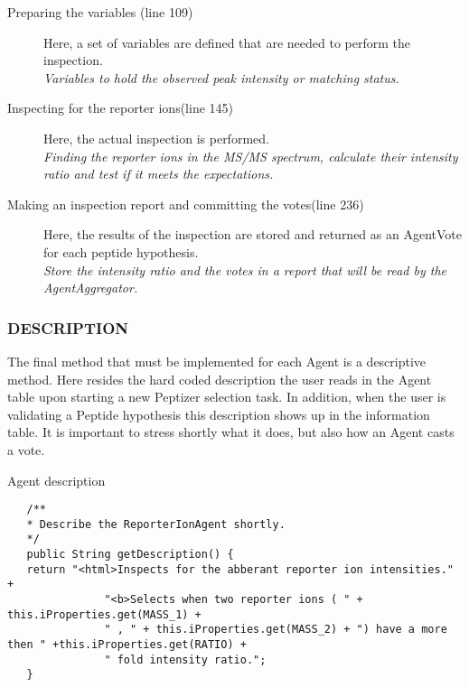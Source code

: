 {\begin{description}
\item[Preparing the variables (line 109)] Here, a set of variables are defined that are needed to perform the inspection.\\\textit{Variables to hold the observed peak intensity or matching status.}
\item[Inspecting for the reporter ions(line 145)] Here, the actual inspection is performed.\\\textit{Finding the reporter ions in the MS/MS spectrum, calculate their intensity ratio and test if it meets the expectations.}
\item[Making an inspection report and committing the votes(line 236)] Here, the results of the inspection are stored and returned as an AgentVote for each peptide hypothesis.\\\textit{Store the intensity ratio and the votes in a report that will be read by the AgentAggregator.}
\end{description}
%
%

\subsubsection{DESCRIPTION}
\npar The final method that must be implemented for each Agent is a descriptive method. Here resides the hard coded description the user reads in the Agent table upon starting a new Peptizer selection task. In addition, when the user is validating a Peptide hypothesis this description shows up in the information table.
\npar It is important to stress shortly what it does, but also how an Agent casts a vote.
%
\begin{algorithm}[H]
\caption{Agent description}
\scriptsize
\vspace{0.3cm}
\begin{verbatim}
   /**
   * Describe the ReporterIonAgent shortly.
   */
   public String getDescription() {
   return "<html>Inspects for the abberant reporter ion intensities." +
               "<b>Selects when two reporter ions ( " + this.iProperties.get(MASS_1) +
               " , " + this.iProperties.get(MASS_2) + ") have a more then " +this.iProperties.get(RATIO) +
               " fold intensity ratio.";
   }
\end{verbatim}
\end{algorithm}
}
